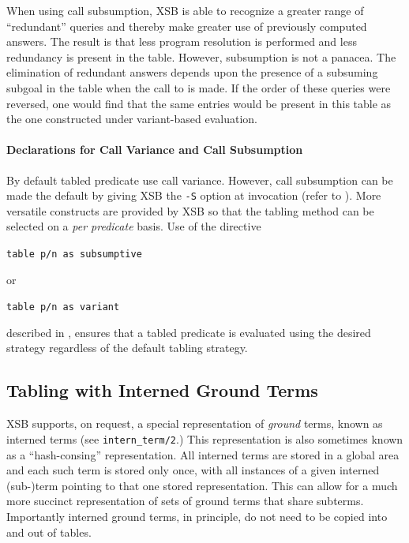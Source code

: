 %
When using call subsumption, XSB is able to recognize a greater range
of ``redundant'' queries and thereby make greater use of previously
computed answers.  The result is that less program resolution is
performed and less redundancy is present in the table.  However,
subsumption is not a panacea.  The elimination of redundant answers
depends upon the presence of a subsuming subgoal in the table when the
call to  is made.  If the order of these queries were
reversed, one would find that the same entries would be present in
this table as the one constructed under variant-based evaluation.

\paragraph{Declarations for Call Variance and Call Subsumption}
By default tabled predicate use call variance.  However, call
subsumption can be made the default by giving XSB the \verb|-S| option
at invocation (refer to ).  More versatile
constructs are provided by XSB so that the tabling method can be
selected on a \emph{per predicate} basis.  Use of the directive

{\tt table p/n as subsumptive}

or 

{\tt table p/n as variant}

described in , ensures that a tabled
predicate is evaluated using the desired strategy regardless of the
default tabling strategy.

\subsection{Tabling with Interned Ground Terms} 
\label{section:interntabling}
 \label{section:interned-terms}

XSB supports, on request, a special representation of {\em ground}
terms, known as interned terms (see {\tt intern\_term/2}.)  This
representation is also sometimes known as a ``hash-consing''
representation.  All interned terms are stored in a global area and
each such term is stored only once, with all instances of a given
interned (sub-)term pointing to that one stored representation.  This
can allow for a much more succinct representation of sets of ground
terms that share subterms.  Importantly interned ground terms, in
principle, do not need to be copied into and out of tables.

